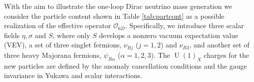 \documentclass[12pt]{article}
\begin{document}
With the aim to illustrate the one-loop Dirac neutrino mass generation
we consider the particle content shown in Table \ref{tab:partcont} as
a possible realization of the effective operator $\mathcal{O}_{6D}$. Specifically, we introduce three scalar fields
$\eta, \sigma$ and $S$, where only $S$ develops a nonzero vacuum
expectation value (VEV),  a set of three singlet fermions,
$\nu_{Rj}$ ($j=1,2$) and $\nu_{R3}$, and another set of three heavy Majorana fermions, $\psi_{R\alpha}$ ($\alpha=1,2,3$).  
The $\operatorname{U}(1)_X$ charges for the new particles are defined by the anomaly cancellation conditions and the gauge invariance in Yukawa and scalar interactions.
\end{document}
